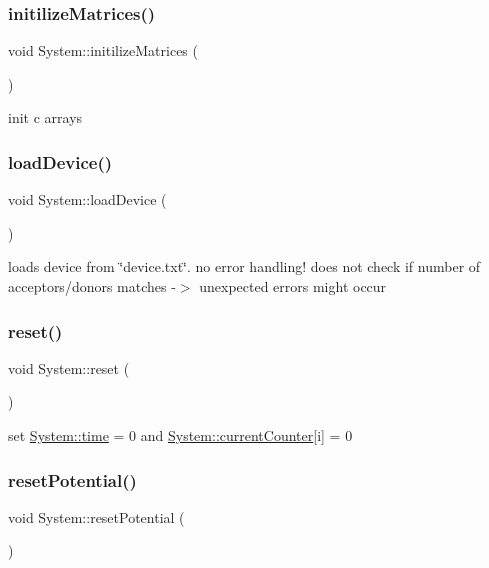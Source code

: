\subsubsection{\texorpdfstring{initilize\+Matrices()}{initilizeMatrices()}}
{\footnotesize\ttfamily void System\+::initilize\+Matrices (\begin{DoxyParamCaption}{ }\end{DoxyParamCaption})}

init c arrays \mbox{\label{classSystem_abe7a2b35b346ac9d823b5431d277d391}} 
\subsubsection{\texorpdfstring{load\+Device()}{loadDevice()}}
{\footnotesize\ttfamily void System\+::load\+Device (\begin{DoxyParamCaption}{ }\end{DoxyParamCaption})}

loads device from \char`\"{}device.\+txt\char`\"{}. no error handling! does not check if number of acceptors/donors matches -\/$>$ unexpected errors might occur \mbox{\label{classSystem_a2029214f3faeefd335b67b2264b61fe5}} 
\subsubsection{\texorpdfstring{reset()}{reset()}}
{\footnotesize\ttfamily void System\+::reset (\begin{DoxyParamCaption}{ }\end{DoxyParamCaption})}

set \hyperlink{classSystem_aa9e002a5f2f169e37c545b76ee67e724}{System\+::time} = 0 and \hyperlink{classSystem_a8d4858c73f66a84785384ff1fb741e7e}{System\+::current\+Counter}\mbox{[}i\mbox{]} = 0 \mbox{\label{classSystem_a94a96fbd71935aac883f3d9e026661ac}} 
\subsubsection{\texorpdfstring{reset\+Potential()}{resetPotential()}}
{\footnotesize\ttfamily void System\+::reset\+Potential (\begin{DoxyParamCaption}{ }\end{DoxyParamCaption})\hspace{0.3cm}{\ttfamily [private]}}

